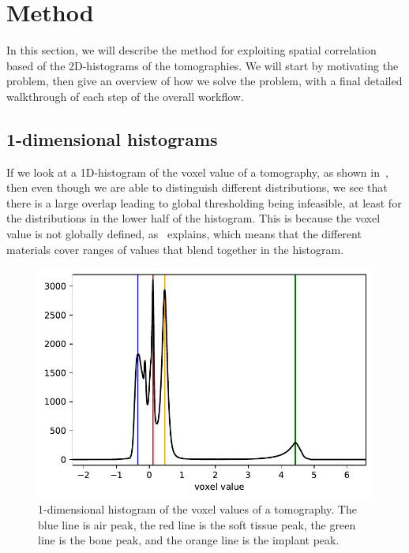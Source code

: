 \section{Method}\label{sec:method}
In this section, we will describe the method for exploiting spatial correlation based of the 2D-histograms of the tomographies.
We will start by motivating the problem, then give an overview of how we solve the problem, with a final detailed walkthrough of each step of the overall workflow.

\subsection{1-dimensional histograms}
If we look at a 1D-histogram of the voxel value of a tomography, as shown in~, then even though we are able to distinguish different distributions, we see that there is a large overlap leading to global thresholding being infeasible, at least for the distributions in the lower half of the histogram.
This is because the voxel value is not globally defined, as~ explains, which means that the different materials cover ranges of values that blend together in the histogram.

\begin{figure}
    \centering
    \includegraphics[width=\linewidth]{figures/1d_hist.pdf}
    \caption{1-dimensional histogram of the voxel values of a tomography. The blue line is air peak, the red line is the soft tissue peak, the green line is the bone peak, and the orange line is the implant peak.}
    \label{fig:1d-hist}
\end{figure}

